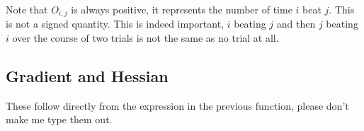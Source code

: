 \documentclass[12pt]{article}
\begin{document}
Note that $O_{i,j}$ is always positive, it represents the number of time $i$ beat $j$. This is not a signed quantity.
This is indeed important, $i$ beating $j$ and then $j$ beating $i$ over the course of two trials is not the same as no trial at all.


\subsection{Gradient and Hessian}

These follow directly from the expression in the previous function, please don't make me type them out.


\printbibliography
\end{document}
